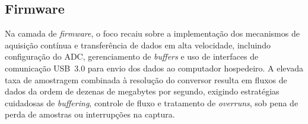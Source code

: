%
%

\subsection{Firmware}

Na camada de \textit{firmware}, o foco recaiu sobre a implementação dos mecanismos de aquisição contínua e transferência de dados em alta velocidade, incluindo configuração do ADC, gerenciamento de \textit{buffers} e uso de interfaces de comunicação USB~3.0 para envio dos dados ao computador hospedeiro. A elevada taxa de amostragem combinada à resolução do conversor resulta em fluxos de dados da ordem de dezenas de megabytes por segundo, exigindo estratégias cuidadosas de \textit{buffering}, controle de fluxo e tratamento de \textit{overruns}, sob pena de perda de amostras ou interrupções na captura.

